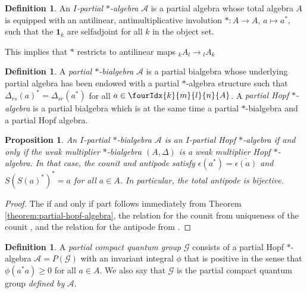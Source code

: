 \documentclass[10pt]{article}
\newcommand{\GrDA}[3]{{}_{#2}#1_{#3}} %
\newcommand{\Gr}[5]{\fourIdx{#2}{#4}{#3}{#5}{#1}}%
\newtheorem{Prop}[Theorem]{Proposition}
\theoremstyle{definition}
\newtheorem{Def}[Theorem]{Definition}
\numberwithin{equation}{section}
\begin{document}
 
\begin{Def} An \emph{$I$-partial $*$-algebra} $\mathscr{A}$ is a partial
  algebra whose total algebra $A$ is equipped with an antilinear,
  antimultiplicative involution $*\colon A\rightarrow A$, $ a\mapsto
  a^*$,  such that the $\mathbf{1}_k$ are selfadjoint for all $k$ in
  the object set. 
\end{Def} 

This implies that $*$ restricts to antilinear maps $\GrDA{A}{k}{l}\rightarrow \GrDA{A}{l}{k}$


\begin{Def} A \emph{partial $*$-bialgebra} $\mathscr{A}$ is a
 partial bialgebra whose underlying partial algebra has been
  endowed with a partial $*$-algebra structure such that
$\Delta_{rs}(a)^* = \Delta_{sr}(a^*)$ for all $a \in \Gr{A}{k}{l}{m}{n}$.
A \emph{partial Hopf $*$-algebra} is a partial bialgebra which is at the same time a partial $*$-bialgebra and a partial Hopf algebra.
\end{Def} 

\begin{Prop} \label{cor:involutive}
  An $I$-partial $*$-bialgebra $\mathscr{A}$ is an $I$-partial Hopf
  $*$-algebra if and only if the weak multiplier $*$-bialgebra
  $(A,\Delta)$ is a weak multiplier Hopf $*$-algebra. In that case,
  the counit and antipode satisfy
  $\epsilon(a^{*})=\overline{\epsilon(a)}$ and $S(S(a)^{*})^{*}=a$ for
  all $a\in A$. In particular, the total antipode is bijective.
\end{Prop}
\begin{proof}
  The if and only if part follows immediately from  Theorem
  \ref{theorem:partial-hopf-algebra}, the relation for the counit  from
uniqueness of the counit  \cite[Theorem 2.8]{Boh1}, and the relation
for the antipode from \cite[Proposition 4.11]{VDW1}.
\end{proof}

\begin{Def} A \emph{partial compact quantum group} $\mathscr{G}$ consists of a
  partial Hopf $*$-algebra $\mathscr{A} = P(\mathscr{G})$ with an invariant integral  $\phi$ that is positive in the sense  that $\phi(a^*a)\geq 0$ for all $a\in A$. We also say that $\mathscr{G}$ is the partial compact quantum group \emph{defined by} $\mathscr{A}$.
\end{Def} 
\end{document}
